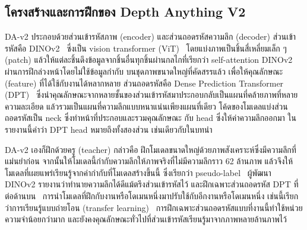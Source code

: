 \subsection{โครงสร้างและการฝึกของ Depth Anything V2}
\mbox{DA-v2} ประกอบด้วยส่วนเข้ารหัสภาพ (encoder) และส่วนถอดรหัสความลึก (decoder)
ส่วนเข้ารหัสคือ DINOv2~\cite{dinov2} ซึ่งเป็น vision transformer (ViT)~\cite{vit}
โดยแบ่งภาพเป็นชิ้นสี่เหลี่ยมเล็ก ๆ (patch) แล้วให้แต่ละชิ้นดึงข้อมูลจากชิ้นอื่นทุกชิ้นผ่านกลไกที่เรียกว่า self-attention
DINOv2 ผ่านการฝึกล่วงหน้าโดยไม่ใช้ข้อมูลกำกับ บนชุดภาพขนาดใหญ่ที่คัดสรรแล้ว
เพื่อให้คุณลักษณะ (feature) ที่ได้ใช้กับงานได้หลากหลาย ส่วนถอดรหัสคือ Dense Prediction Transformer (DPT)~\cite{dpt}
ซึ่งนำคุณลักษณะจากหลายชั้นของส่วนเข้ารหัสมาประกอบกลับเป็นแผนที่คล้ายภาพที่หลายความละเอียด
แล้วรวมเป็นแผนที่ความลึกแบบหนาแน่นเพียงแผนที่เดียว โค้ดของโมเดลแบ่งส่วนถอดรหัสเป็น neck
ซึ่งทำหน้าที่ประกอบและรวมคุณลักษณะ กับ head ซึ่งให้ค่าความลึกออกมา ในรายงานนี้คำว่า DPT head
หมายถึงทั้งสองส่วน เช่นเดียวกับในบทนำ

\mbox{DA-v2} เองก็ฝึกด้วยครู (teacher) กล่าวคือ ฝึกโมเดลขนาดใหญ่ด้วยภาพสังเคราะห์ซึ่งมีความลึกที่แม่นยำก่อน
จากนั้นให้โมเดลนี้กำกับความลึกให้ภาพจริงที่ไม่มีความลึกราว 62 ล้านภาพ แล้วจึงให้โมเดลที่เผยแพร่เรียนรู้จากค่ากำกับที่โมเดลสร้างขึ้นนี้
ซึ่งเรียกว่า pseudo-label~\cite{da2} ผู้พัฒนา DINOv2 รายงานว่าทำนายความลึกได้ดีแม้ตรึงส่วนเข้ารหัสไว้
และฝึกเฉพาะส่วนถอดรหัส DPT ที่ต่อด้านบน~\cite{dinov2} การนำโมเดลที่ฝึกกับงานหรือโดเมนหนึ่งมาปรับใช้กับอีกงานหรือโดเมนหนึ่ง
เช่นนี้เรียกว่าการเรียนรู้แบบถ่ายโอน (transfer learning)~\cite{yosinski}
การฝึกเฉพาะส่วนถอดรหัสแบบที่งานนี้ทำใช้หน่วยความจำน้อยกว่ามาก
และยังคงคุณลักษณะทั่วไปที่ส่วนเข้ารหัสเรียนรู้มาจากภาพหลายล้านภาพไว้

